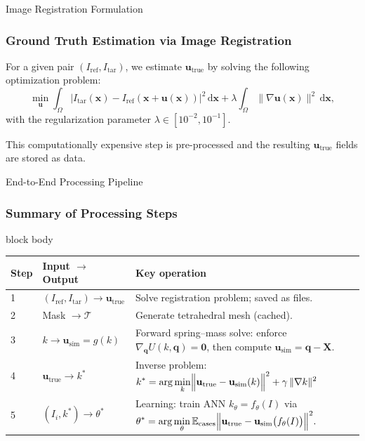 \documentclass{beamer}
\begin{document}
\begin{frame}[fragile]{Image Registration Formulation}
    \frametitle{Ground Truth Estimation via Image Registration}
    For a given pair $(I_{\mathrm{ref}}, I_{\mathrm{tar}})$, we estimate $\mathbf{u}_{\mathrm{true}}$ by solving the following optimization problem:
    \begin{equation}
    \label{eq:registration}
    \min_{\mathbf{u}}
      \int_{\Omega} \bigl|I_{\mathrm{tar}}(\mathbf{x}) - I_{\mathrm{ref}}(\mathbf{x} + \mathbf{u}(\mathbf{x}))\bigr|^2 \,\mathrm{d}\mathbf{x}
      + \lambda \int_{\Omega} \lVert\nabla \mathbf{u}(\mathbf{x})\rVert^2 \,\mathrm{d}\mathbf{x},
    \end{equation}
    with the regularization parameter $\lambda\in[10^{-2},10^{-1}]$.
    \vfill
    \begin{alertblock}{}
    This computationally expensive step is pre-processed and the resulting $\mathbf{u}_{\mathrm{true}}$ fields are stored as data.
    \end{alertblock}
\end{frame}

\begin{frame}[fragile]{End-to-End Processing Pipeline}
    \frametitle{Summary of Processing Steps}
    \begin{beamercolorbox}[sep=0.5em]{block body}
    \tiny
    \begin{tabular}{@{}p{1.2cm}p{3.5cm}p{5.5cm}@{}}
    \toprule
    \textbf{Step} & \textbf{Input \(\to\) Output} & \textbf{Key operation} \\
    \midrule
    1 & \((I_{\mathrm{ref}},I_{\mathrm{tar}})\to\mathbf{u}_{\mathrm{true}}\) &
      Solve registration problem; saved as files. \\[1em]
    2 & Mask \(\to \mathcal{T}\) &
      Generate tetrahedral mesh (cached). \\[1em]
    3 & \(k \to \mathbf{u}_{\mathrm{sim}} = g(k)\) &
      Forward spring–mass solve: enforce \(\nabla_{\mathbf{q}}U(k,\mathbf{q}) = \mathbf{0}\), then compute \(\mathbf{u}_{\mathrm{sim}} = \mathbf{q} - \mathbf{X}.\) \\[1em]
    4 & \(\mathbf{u}_{\mathrm{true}}\to k^*\) & 
      Inverse problem:
      \(\displaystyle
        k^* = \arg\min_k \Bigl\lVert \mathbf{u}_{\mathrm{true}}
        - \mathbf{u}_{\mathrm{sim}}(k)\Bigr\rVert^2
        + \gamma\,\|\nabla k\|^2
      \)\\[2em]
    5 & \((I_i, k^*)\to \theta^*\) &
      Learning: train ANN \(k_\theta = f_\theta(I)\) via
      \(\displaystyle
        \theta^* = \arg\min_\theta 
        \mathbb{E}_{\mathrm{cases}}
        \Bigl\lVert \mathbf{u}_{\mathrm{true}}
        - \mathbf{u}_{\mathrm{sim}}\bigl(f_\theta(I)\bigr)\Bigr\rVert^2.
      \) \\
    \bottomrule
    \end{tabular}
    \end{beamercolorbox}
\end{frame}
\end{document}
